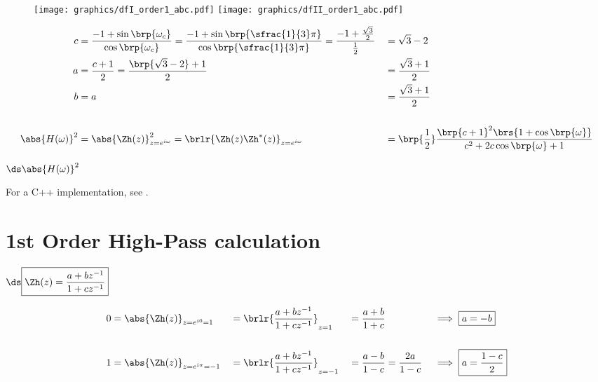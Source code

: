 \begin{figure}
  \centering%
  \texttt{[image: graphics/dfI\_order1\_abc.pdf]}
  \texttt{[image: graphics/dfII\_order1\_abc.pdf]}
\end{figure}
\begin{example}[order 1 low-pass filter with corner frequency $\omega_c=\frac{2}{3}\pi$]
{ \begin{align*}
  c &= \frac{-1 + \sin\brp{\omega_c}}{\cos\brp{\omega_c}}
     = \frac{-1 + \sin\brp{\sfrac{1}{3}\pi}}{\cos\brp{\sfrac{1}{3}\pi}}
     = \frac{-1 + \frac{\sqrt{3}}{2}}{\frac{1}{2}}
   &&= \sqrt{3} - 2
  \\
  a &= \frac{c+1}{2}
     = \frac{\brp{\sqrt{3} - 2}+1}{2}
   &&= \frac{\sqrt{3}+1}{2}
  \\
  b &= a
   &&= \frac{\sqrt{3} + 1}{2}
  \\
  \\
  \abs{H(\omega)}^2
    &= \abs{\Zh(z)}^2_{z=e^{i\omega}}
     = \brlr{\Zh(z)\Zh^\ast(z)}_{z=e^{i\omega}}
   &&= \brp{\frac{1}{2}}\frac{\brp{c+1}^2\brs{1 +  \cos\brp{\omega}}}
            {c^2 + 2 c\cos\brp{\omega} + 1}
\end{align*}}

$\ds\abs{H(\omega)}^2$
\end{example}


For a C++ implementation, see .

\section{1st Order High-Pass calculation}
$\ds\boxed{ \Zh(z) = \frac{a + bz^{-1}}
                        {1 + cz^{-1}}
          }$

\begin{align*}
  0 &= {\abs{\Zh(z)}}_{z=e^{i0}=1}    
    &&=\brlr{\frac{a + bz^{-1}}{1 + cz^{-1}}}_{z=1} 
    &&=\frac{a + b}{1 + c}                   
    && \implies \boxed{a=-b}
  \\\\
  1 &= \abs{\Zh(z)}_{z=e^{i\pi}=-1} 
   &&= \brlr{\frac{a + bz^{-1}}{1 + cz^{-1}}}_{z=-1} 
   &&= \frac{a - b}{1 - c} = \frac{2a}{1-c}                   
   &&  \implies \boxed{a=\frac{1-c}{2}}
\end{align*}


